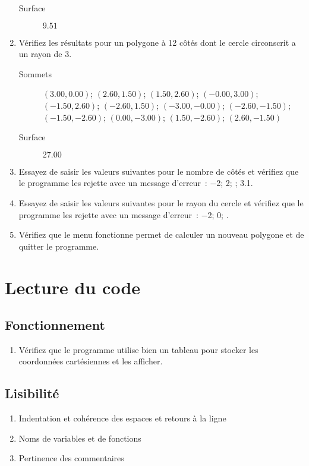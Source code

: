 \documentclass[11pt,french,a4paper,twoside]{scrartcl}
\begin{document}
\begin{enumerate}
\begin{description}
		      \item[Surface] \(\num{9.51}\)
	      \end{description}
	\item Vérifiez les résultats pour un polygone à 12 côtés dont le cercle circonscrit a un rayon de \num{3}.
	      \begin{description}
		      \item[Sommets] \(\left(\num{3.00}, \num{0.00}\right)\); \(\left(\num{2.60}, \num{1.50}\right)\); \(\left(\num{1.50}, \num{2.60}\right)\); \(\left(\num{-0.00}, \num{3.00}\right)\); \(\left(\num{-1.50}, \num{2.60}\right)\); \(\left(\num{-2.60}, \num{1.50}\right)\); \(\left(\num{-3.00}, \num{-0.00}\right)\); \(\left(\num{-2.60}, \num{-1.50}\right)\); \(\left(\num{-1.50}, \num{-2.60}\right)\); \(\left(\num{0.00}, \num{-3.00}\right)\); \(\left(\num{1.50}, \num{-2.60}\right)\); \(\left(\num{2.60}, \num{-1.50}\right)\)
		      \item[Surface] \(\num{27.00}\)
	      \end{description}
	\item Essayez de saisir les valeurs suivantes pour le nombre de côtés et vérifiez que le programme les rejette avec un message d'erreur~: \num{-2}; \num{2}; ; \num{3.1}.
	\item Essayez de saisir les valeurs suivantes pour le rayon du cercle et vérifiez que le programme les rejette avec un message d'erreur~: \num{-2}; \num{0}; .
	\item Vérifiez que le menu fonctionne permet de calculer un nouveau polygone et de quitter le programme.
\end{enumerate}

\section{Lecture du code}

\subsection{Fonctionnement}
\begin{enumerate}
	\item Vérifiez que le programme utilise bien un tableau pour stocker les coordonnées cartésiennes et les afficher.
\end{enumerate}

\subsection{Lisibilité}
\begin{enumerate}
	\item Indentation et cohérence des espaces et retours à la ligne
	\item Noms de variables et de fonctions
	\item Pertinence des commentaires
\end{enumerate}
\end{document}
